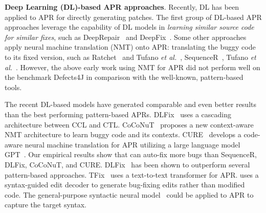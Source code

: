 {\bf Deep Learning (DL)-based APR approaches}. Recently, DL has been
applied to APR for directly generating patches.  The first group of
DL-based APR approaches leverage the capability of DL models in {\em
  learning similar source code for similar fixes}, such as
DeepRepair~\cite{white2016deep} and DeepFix~\cite{gupta2017deepfix}.
Some other approaches apply neural machine translation (NMT) onto APR:
translating the buggy code to its fixed version, such as
Ratchet~\cite{hata2018learning} and Tufano {\em et
  al.}~\cite{tufano2018empirical}, SequenceR~\cite{chen2018sequencer},
Tufano {\em et al.}~\cite{tufano2019learning}. However, the above
early work using NMT for APR did not perform well on the benchmark
Defects4J in comparison with the well-known, pattern-based tools.

The recent DL-based models have generated comparable and even better
results than the best performing pattern-based
APRs. DLFix~\cite{icse20} uses a cascading architecture
between CCL and CTL.
CoCoNuT~\cite{lutellier2020coconut} proposes a new context-aware NMT
architecture to learn buggy code and its
contexts. CURE~\cite{cure-icse21} develops a code-aware neural machine
translation for APR utilizing a large language model
GPT~\cite{radford2018improving}. Our empirical results show that
{\tool} can auto-fix more bugs than SequenceR, DLFix, CoCoNuT, and
CURE. DLFix~\cite{icse20} has been shown to outperform several
pattern-based approaches. TFix~\cite{tfix-21} uses a text-to-text
transformer for APR. \cite{recoder-fse21} uses a syntax-guided edit
decoder to generate bug-fixing edits rather than modified code.  The
general-purpose syntactic neural
model~\cite{yin-neubig-2017-syntactic} could be applied to APR to
capture the target syntax.

  

